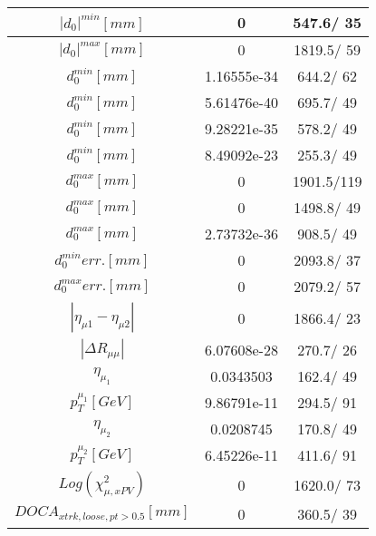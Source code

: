 \documentclass{article}
\begin{document}
\begin{table}[htbp]
\begin{center}
\begin{tabular}{c|c|c}
\hline
$|d_{0}|^{min} [mm]$ & 0 & 547.6/ 35\\
\hline
$|d_{0}|^{max} [mm]$ & 0 & 1819.5/ 59\\
\hline
$d_{0}^{min} [mm]$ & 1.16555e-34 & 644.2/ 62\\
\hline
$d_{0}^{min} [mm]$ & 5.61476e-40 & 695.7/ 49\\
\hline
$d_{0}^{min} [mm]$ & 9.28221e-35 & 578.2/ 49\\
\hline
$d_{0}^{min} [mm]$ & 8.49092e-23 & 255.3/ 49\\
\hline
$d_{0}^{max} [mm]$ & 0 & 1901.5/119\\
\hline
$d_{0}^{max} [mm]$ & 0 & 1498.8/ 49\\
\hline
$d_{0}^{max} [mm]$ & 2.73732e-36 & 908.5/ 49\\
\hline
$d_{0}^{min} err. [mm]$ & 0 & 2093.8/ 37\\
\hline
$d_{0}^{max} err. [mm]$ & 0 & 2079.2/ 57\\
\hline
$|\eta_{\mu1}-\eta_{\mu2}|$ & 0 & 1866.4/ 23\\
\hline
$|\Delta R_{\mu \mu}|$ & 6.07608e-28 & 270.7/ 26\\
\hline
$\eta_{\mu_{1}}$ & 0.0343503 & 162.4/ 49\\
\hline
$p_{T}^{\mu_{1}} [GeV]$ & 9.86791e-11 & 294.5/ 91\\
\hline
$\eta_{\mu_{2}}$ & 0.0208745 & 170.8/ 49\\
\hline
$p_{T}^{\mu_{2}} [GeV]$ & 6.45226e-11 & 411.6/ 91\\
\hline
$Log(\chi^{2}_{\mu,xPV})$ & 0 & 1620.0/ 73\\
\hline
$DOCA_{xtrk, loose, pt>0.5} [mm]$ & 0 & 360.5/ 39\\
\hline
\end{tabular}
\end{center}
\end{table}
\end{document}
